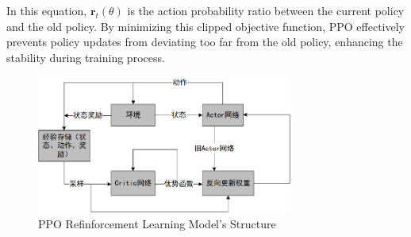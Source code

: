 In this equation, \( \boldsymbol{r}_t(\theta) \) is the action probability ratio between the current policy and the old policy. By minimizing this clipped objective function, PPO effectively prevents policy updates from deviating too far from the old policy, enhancing the stability during training process.

\begin{figure}[hbt]
	\centering
	\includegraphics[width=0.75\textwidth]{figures/2.6}
	\caption{PPO Refinforcement Learning Model's Structure}\label{fig:2.6}
\end{figure}


